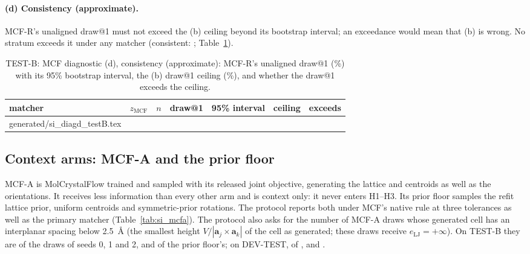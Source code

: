 \documentclass[journal=acsodf,manuscript=article]{achemso}
\makeatletter
\newcommand{\inputrows}[1]{\@@input #1 }
\makeatother
\begin{document}
\paragraph{(d) Consistency (approximate).} MCF-R's unaligned draw@1 must not exceed the (b)
ceiling beyond its bootstrap interval; an exceedance would mean that (b) is wrong. No stratum
exceeds it under any matcher (consistent: \svDiagDConsistent; Table~\ref{tab:si_diagd}).

\begin{table}[htbp]
\caption{TEST-B: MCF diagnostic (d), consistency (approximate): MCF-R's unaligned draw@1 (\%)
with its 95\% bootstrap interval, the (b) draw@1 ceiling (\%), and whether the draw@1 exceeds the
ceiling.}
\label{tab:si_diagd}
\centering
\small
\begin{tabular}{@{}lcrcccc@{}}
\toprule
matcher & $z_\mathrm{MCF}$ & $n$ & draw@1 & 95\% interval & ceiling & exceeds \\
\midrule
\inputrows{generated/si_diagd_testB.tex}
\bottomrule
\end{tabular}
\end{table}

\subsection{Context arms: MCF-A and the prior floor}
MCF-A is MolCrystalFlow trained and sampled with its released joint objective, generating the
lattice and centroids as well as the orientations. It receives less information than every
other arm and is context only: it never enters H1--H3. Its prior floor samples the refit
lattice prior, uniform centroids and symmetric-prior rotations. The protocol reports both under
MCF's native rule at three tolerances as well as the primary matcher (Table~\ref{tab:si_mcfa}).
The protocol also asks for the number of MCF-A draws whose generated cell has an interplanar
spacing below 2.5~\AA{} (the smallest height $V/|\mathbf{a}_j\times\mathbf{a}_k|$ of the cell as
generated; these draws receive $e_\mathrm{LJ}=+\infty$). On TEST-B they are \svSpacingMcfA{} of
the \svSpacingDraws{} draws of seeds 0, 1 and 2, and \svSpacingMcfAFloor{} of the prior
floor's; on DEV-TEST, \svSpacingMcfADev{} of \svSpacingDrawsDev{}, and \svSpacingMcfAFloorDev{}.
\end{document}
